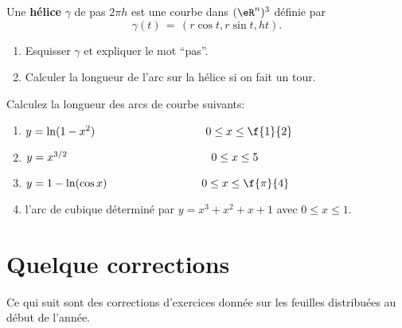 \exerNico
Une {\bf hélice} $\gamma$ de pas $2 \pi h$ est une courbe dans $(\eR^n)^3$ définie par
$$
\gamma (t) \,=\, \left( r \cos t , r \sin t , h t \right)  .
$$

\begin{enumerate}
\item Esquisser $\gamma$ et expliquer le mot ``pas''.

\item Calculer la longueur de l'arc sur la hélice si on fait un tour.
\end{enumerate}

\exerNico Calculez la longueur des arcs de courbe suivants:
\begin{enumerate}
\item $y= \ln(1-x^2)  \hspace{3.5cm} 0\leq x\leq \f{1}{2}$
\item  $y= x^{3/2}  \hspace{4.57cm} 0\leq x\leq 5$
\item $y = 1-\ln(\cos x) \hspace{3cm} 0\leq x \leq \f{\pi}{4}$
\item l'arc de cubique déterminé par $y=x^3+x^2+x+1$ avec $0\leq x \leq 1$.
\end{enumerate}


                    \section{Quelque corrections}

Ce qui suit sont des corrections d'exercices donnée sur les feuilles distribuées au début de l'année.

